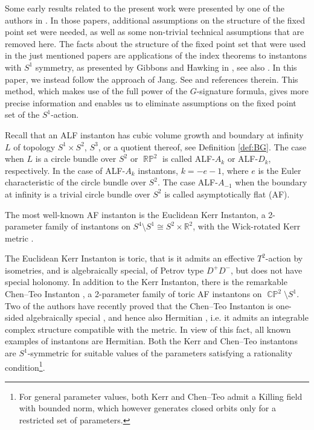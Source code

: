 \documentclass[a4paper,10pt,reqno]{amsart}
\newcommand{\Reals}{\mathbb{R}}
\theoremstyle{plain}
\DeclareMathOperator{\CP}{\mathbb{C}\mathbb{P}}
\DeclareMathOperator{\RP}{\mathbb{R}\mathbb{P}}
\numberwithin{equation}{section}
\begin{document}
Some early results related to the present work were presented by one of the authors in \cite{simon:1995,mars:simon:1999}. In those papers,  additional assumptions on the structure of the fixed point set were needed, as well as some non-trivial technical assumptions that are removed here. The facts about the structure of the fixed point set that were used in the just mentioned papers are applications of the index theorems  to instantons with $S^1$ symmetry, as presented by Gibbons and Hawking in \cite{gibbons:hawking:1979}, see also \cite{1979NuPhB.157..377G}. In this paper, we instead follow the approach of Jang. See \cite{2018JGP...133..181J} and references therein. This method, which makes use of the full power of the $G$-signature formula, gives more precise information and enables us to eliminate assumptions on the fixed point set of the $S^1$-action.

Recall that an ALF instanton has cubic volume growth and boundary at infinity $L$ of topology $S^1\times S^2$, $S^3$, or a quotient thereof, see Definition \ref{def:BG}. The case when $L$ is a circle bundle over $S^2$ or $\RP^2$ is called ALF-$A_k$ or ALF-$D_k$, respectively. In the case of  ALF-$A_k$ instantons, $k = - e -1$, where $e$ is the Euler characteristic of the circle bundle over $S^2$. The case ALF-$A_{-1}$ when the boundary at infinity is a trivial circle bundle over $S^2$ is called asymptotically flat (AF). 

The most well-known AF instanton is the Euclidean Kerr Instanton, a 2-parameter family of instantons on  $S^4 \setminus S^1 \cong S^2 \times \Reals^2$, with the Wick-rotated  Kerr metric \cite{1977PhRvD..15.2752G,1978RSPSA.358..467G,1998PhRvD..59b4009H}. 

The Euclidean Kerr Instanton is toric, that is it admits an effective $T^2$-action by isometries, and is algebraically special, of Petrov type $D^+D^-$, but does not have special holonomy. In addition to the Kerr Instanton, there is the remarkable Chen--Teo Instanton \cite{2011PhLB..703..359C}, a 2-parameter family of toric AF instantons on $\CP^2 \setminus S^1$. Two of the authors have recently proved that the Chen--Teo Instanton is one-sided algebraically special \cite{MR4809333}, and hence also Hermitian \cite{MR707181}, i.e. it admits an integrable complex structure compatible with the metric. In view of this fact, all known examples of instantons are Hermitian. Both the  Kerr and Chen--Teo instantons are $S^1$-symmetric for suitable values of the parameters satisfying a rationality condition\footnote{For general parameter values, both Kerr and Chen--Teo admit a Killing field with bounded norm, which however generates closed orbits only for a restricted set of parameters.}. 
\end{document}
